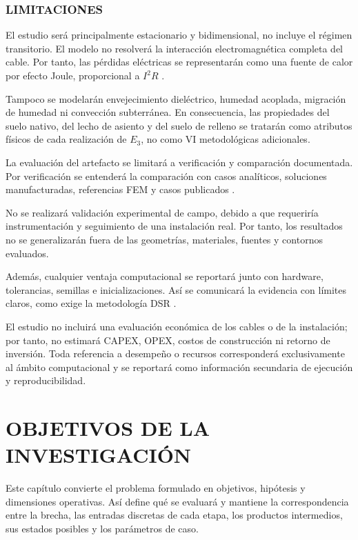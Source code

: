 \documentclass[11pt,a4paper,oneside]{report}
\begin{document}
\subsection{LIMITACIONES}

El estudio será principalmente estacionario y bidimensional, no incluye el régimen transitorio. El modelo no resolverá la interacción electromagnética completa del cable. Por tanto, las pérdidas eléctricas se representarán como una fuente de calor por efecto Joule, proporcional a $I^2R$ \parencites[752--760]{neher1957}[cláusulas 4--5]{iec60287}.

Tampoco se modelarán envejecimiento dieléctrico, humedad acoplada, migración de humedad ni convección subterránea. En consecuencia, las propiedades del suelo nativo, del lecho de asiento y del suelo de relleno se tratarán como atributos físicos de cada realización de $E_3$, no como VI metodológicas adicionales.

La evaluación del artefacto se limitará a verificación y comparación documentada. Por verificación se entenderá la comparación con casos analíticos, soluciones manufacturadas, referencias FEM y casos publicados \parencites{cigre2022}[3--4,93--99]{cigre2025}.

No se realizará validación experimental de campo, debido a que requeriría instrumentación y seguimiento de una instalación real. Por tanto, los resultados no se generalizarán fuera de las geometrías, materiales, fuentes y contornos evaluados.

Además, cualquier ventaja computacional se reportará junto con hardware, tolerancias, semillas e inicializaciones. Así se comunicará la evidencia con límites claros, como exige la metodología DSR \parencite[350--351]{gregor2013}.

El estudio no incluirá una evaluación económica de los cables o de la instalación; por tanto, no estimará CAPEX, OPEX, costos de construcción ni retorno de inversión. Toda referencia a desempeño o recursos corresponderá exclusivamente al ámbito computacional y se reportará como información secundaria de ejecución y reproducibilidad.

\chapter{OBJETIVOS DE LA INVESTIGACIÓN}
\thispagestyle{empty}

Este capítulo convierte el problema formulado en objetivos, hipótesis y dimensiones operativas. Así define qué se evaluará y mantiene la correspondencia entre la brecha, las entradas discretas de cada etapa, los productos intermedios, sus estados posibles y los parámetros de caso.
\end{document}
